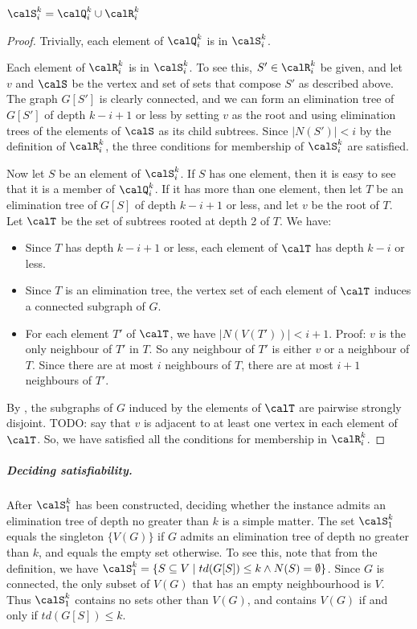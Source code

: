 \begin{proposition}\label{SequalsQunionR}
$\calS_i^k = \calQ_i^k \cup \calR_i^k$
\end{proposition}
\begin{proof}
Trivially, each element of $\calQ_i^k$ is in $\calS_i^k$.

Each element of $\calR_i^k$ is in $\calS_i^k$.  To see this, $S' \in \calR_i^k$ be given, and
let $v$ and $\calS$ be the vertex and set of sets that compose $S'$ as described above.
The graph $G[S']$ is clearly connected, and we can form an elimination tree of $G[S']$ of depth
$k-i+1$ or less by setting $v$ as the root and using elimination trees of the elements of $\calS$
as its child subtrees.  Since $|N(S')| < i$ by the definition of $\calR_i^k$, the three conditions
for membership of $\calS_i^k$ are satisfied.

Now let $S$ be an element of $\calS_i^k$.  If $S$ has one element, then it is easy to see that
it is a member of $\calQ_i^k$.  If it has more than one element, then let $T$ be an elimination
tree of $G[S]$ of depth $k-i+1$ or less, and let $v$ be the root of $T$.  Let $\calT$ be the set
of subtrees rooted at depth 2 of $T$.  We have:

\begin{itemize}
  \item Since $T$ has depth $k-i+1$ or less, each element of $\calT$ has depth $k-i$ or less.  
  \item Since $T$ is an elimination tree, the vertex set of each element of $\calT$ induces a connected
        subgraph of $G$.
  \item For each element $T'$ of $\calT$, we have $|N(V(T'))| < i + 1$.  Proof: $v$ is
        the only neighbour of $T'$ in $T$.  So any neighbour of $T'$ is either $v$ or a neighbour
        of $T$.  Since there are at most $i$ neighbours of $T$, there are at most $i+1$ neighbours
        of $T'$.
\end{itemize}

By , the subgraphs of $G$ induced by the elements of $\calT$
are pairwise strongly disjoint.  TODO: say that $v$ is adjacent to at least one vertex in each
element of $\calT$.  So, we have satisfied all the conditions for membership in $\calR_i^k$.
\end{proof}

\subparagraph*{Deciding satisfiability.}
After $\calS_1^k$ has been constructed, deciding whether the instance admits an elimination tree
of depth no greater than $k$ is a simple matter.  The set $\calS_1^k$ equals the singleton $\{V(G)\}$ if $G$
admits an elimination tree of depth no greater than $k$, and equals the empty set otherwise.
To see this, note that from the definition, we have $\calS_1^k = \{S \subseteq V \mid td(G[S]) \leq k \wedge
N(S) = \emptyset\}$.  Since $G$ is connected, the only subset of $V(G)$ that has an empty neighbourhood
is $V$.  Thus $\calS_1^k$ contains no sets other than $V(G)$, and contains $V(G)$ if and only if $td(G[S]) \leq k$.

